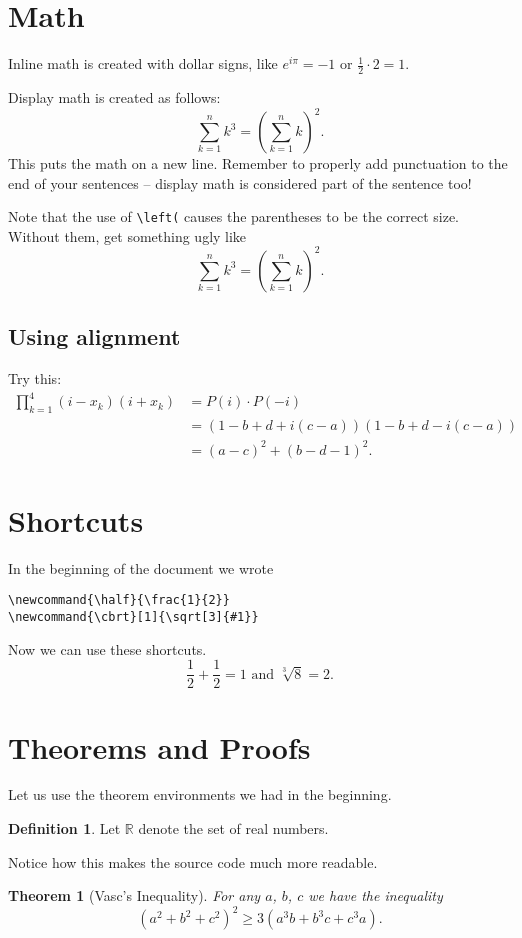 \documentclass[11pt]{scrartcl}
\theoremstyle{plain} %
\newtheorem{theorem}{Theorem}
\theoremstyle{definition}
\newtheorem*{definition}{Definition} %
\theoremstyle{remark}
\newcommand{\half}{\frac{1}{2}}
\newcommand{\cbrt}[1]{\sqrt[3]{#1}}
\begin{document}
\section{Math}
Inline math is created with dollar signs,
like $e^{i \pi} = -1$ or $\half \cdot 2 = 1$.

Display math is created as follows:
\[ \sum_{k=1}^n k^3 = \left( \sum_{k=1}^n k \right)^2. \]
This puts the math on a new line.
Remember to properly add punctuation to the
end of your sentences -- display math is
considered part of the sentence too!

Note that the use of \verb+\left(+
causes the parentheses to be the correct size.
Without them, get something ugly like
\[ \sum_{k=1}^n k^3 = ( \sum_{k=1}^n k )^2. \]

\subsection{Using alignment}
Try this:
\begin{align*}
  \prod_{k=1}^4 \left( i-x_k \right)\left( i+x_k \right) &= P(i) \cdot P(-i) \\
  &= \left( 1-b+d+i(c-a) \right)\left( 1-b+d-i(c-a) \right) \\
  &= (a-c)^2 + \left( b-d-1 \right)^2.
\end{align*}

\section{Shortcuts}
In the beginning of the document we wrote
\begin{verbatim}
\newcommand{\half}{\frac{1}{2}}
\newcommand{\cbrt}[1]{\sqrt[3]{#1}}
\end{verbatim}
Now we can use these shortcuts.
\[ \half + \half = 1 \text{ and } \cbrt{8} = 2. \]

\section{Theorems and Proofs}
\label{sec:theorem}
Let us use the theorem environments we had in the beginning.
\begin{definition}
  Let $\mathbb R$ denote the set of real numbers.
\end{definition}
Notice how this makes the source code much more readable.

\begin{theorem}
  [Vasc's Inequality]
  \label{thm:vasc}
  For any $a$, $b$, $c$ we have the inequality
  \[ \left( a^2+b^2+c^2 \right)^2 \ge 3\left( a^3b+b^3c+c^3a \right). \]
\end{theorem}
\end{document}
